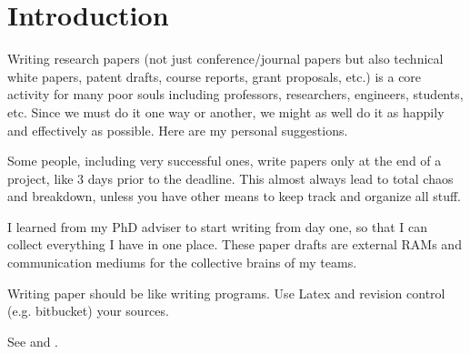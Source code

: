 \section{Introduction}


Writing research papers (not just conference/journal papers but also technical white papers, patent drafts, course reports, grant proposals, etc.) is a core activity for many poor souls including professors, researchers, engineers, students, etc.
Since we must do it one way or another, we might as well do it as happily and effectively as possible.
Here are my personal suggestions.


Some people, including very successful ones, write papers only at the end of a project, like 3 days prior to the deadline.
This almost always lead to total chaos and breakdown, unless you have other means to keep track and organize all stuff.


I learned from my PhD adviser to start writing from day one, so that I can collect everything I have in one place.
These paper drafts are external RAMs and communication mediums for the collective brains of my teams.



Writing paper should be like writing programs.
Use Latex and revision control (e.g. bitbucket) your sources.




See \cite{Sun:2016:MVP} and .

